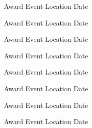 



\begin{cvhonors}

  \cvhonor
    {Award} %
    {Event} %
    {Location} %
    {Date} %

  \cvhonor
    {Award} %
    {Event} %
    {Location} %
    {Date} %

  \cvhonor
    {Award} %
    {Event} %
    {Location} %
    {Date} %

  \cvhonor
    {Award} %
    {Event} %
    {Location} %
    {Date} %

  \cvhonor
    {Award} %
    {Event} %
    {Location} %
    {Date} %

  \cvhonor
    {Award} %
    {Event} %
    {Location} %
    {Date} %

  \cvhonor
    {Award} %
    {Event} %
    {Location} %
    {Date} %

  \cvhonor
    {Award} %
    {Event} %
    {Location} %
    {Date} %

\end{cvhonors}




